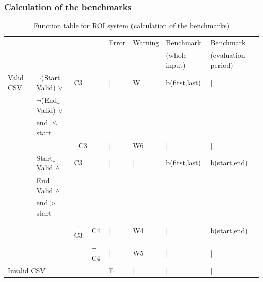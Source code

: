 \documentclass[runningheads,12pt]{article}
\begin{document}
\begin{landscape}
\subsubsection{Calculation of the benchmarks}

\begin{table}[H]
{
\centering

\begin{tabular}{|l|l|l|l||l|l|l|l|}
\hline
\multicolumn{4}{|c||}{} & Error & Warning & Benchmark & Benchmark\\ 
\multicolumn{4}{|l||}{}&&&(whole input) & (evaluation period)\\


\hline
Valid$\_$CSV & $\lnot$(Start$\_$Valid) $\vee$ & \multicolumn{2}{|l||}{C3} & | & W & b(first,last) & |\\ 
& $\lnot$(End$\_$Valid) $\vee$& \multicolumn{2}{|l||}{} &&& &\\
& end $\le$ start & \multicolumn{2}{|l||}{} & &&&\\

\cline{3-8}
& & \multicolumn{2}{|l||}{$\lnot$C3}& | & W6 & | & |\\ 

\cline{2-8}
& Start$\_$Valid  $\wedge$  & \multicolumn{2}{|l||}{C3} & | & | & b(first,last) & b(start,end)\\ 
& End$\_$Valid $\wedge$  & \multicolumn{2}{|l||}{} &&&&\\
& end$>$start   & \multicolumn{2}{|l||}{}&&&&\\

\cline{3-8}
&& $\lnot$C3 & C4 & | & W4 & | & b(start,end)\\

\cline{4-8}
&& & $\lnot$C4 & | & W5 & | & |\\

\hline
\multicolumn{4}{|l||}{Invalid$\_$CSV} & E & |& |& |\\ 

\hline
\end{tabular}

\caption{Function table for ROI system (calculation of the benchmarks)}
\label{table:ftable_bench}
}
\end{table}
\end{landscape}

\end{document}
